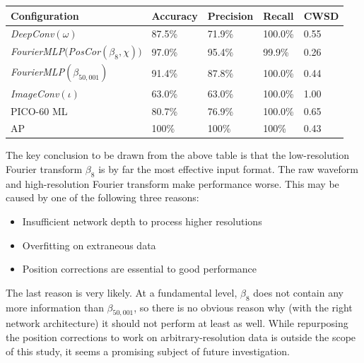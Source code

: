 \documentclass[10pt]{article}
\begin{document}
\begin{minipage}{\textwidth}
    \begin{center}
         \label{super_overview}
        \begin{tabular}{|l|l|l|l|l|}
            \hline
            Configuration & Accuracy & Precision & Recall & CWSD \\
            \hline
            {\it DeepConv}$(\omega)$ & 87.5\% & 71.9\% & 100.0\% & 0.55 \\
            \hline
            {\it FourierMLP}$(${\it PosCor}$(\beta_{8}, \chi))$ & 97.0\% & 95.4\% & 99.9\% & 0.26 \\
            \hline
            {\it FourierMLP}$(\beta_{50,001})$ & 91.4\% & 87.8\% & 100.0\% & 0.44 \\
            \hline
            {\it ImageConv}$(\iota)$ & 63.0\% & 63.0\% & 100.0\% & 1.00 \\
            \hline
            PICO-60 ML & 80.7\% & 76.9\% & 100.0\% & 0.65 \\
            \hline
            AP & 100\% & 100\% & 100\% & 0.43 \\
            \hline
        \end{tabular}
    \end{center}
\end{minipage}

The key conclusion to be drawn from the above table is that the low-resolution Fourier transform $\beta_{8}$ is by far the most effective input format. The raw waveform and high-resolution Fourier transform make performance worse. This may be caused by one of the following three reasons:

\begin{itemize}
    \item Insufficient network depth to process higher resolutions
    \item Overfitting on extraneous data
    \item Position corrections are essential to good performance
\end{itemize}

The last reason is very likely. At a fundamental level, $\beta _8$ does not contain any more information than $\beta _{50,001}$, so there is no obvious reason why (with the right network architecture) it should not perform at least as well. While repurposing the position corrections to work on arbitrary-resolution data is outside the scope of this study, it seems a promising subject of future investigation.
\end{document}
